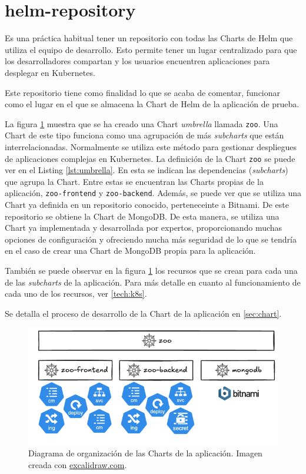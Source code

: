 \section{helm-repository}
\label{subsec:helm}

Es una práctica habitual tener un repositorio con todas las Charts de Helm que utiliza el equipo de desarrollo. Esto permite tener un lugar centralizado para que los desarrolladores compartan y los usuarios encuentren aplicaciones para desplegar en Kubernetes.

Este repositorio tiene como finalidad lo que se acaba de comentar, funcionar como el lugar en el que se almacena la Chart de Helm de la aplicación de prueba.

La figura \ref{fig:helm-repository} muestra que se ha creado una Chart \textit{umbrella} llamada \texttt{zoo}. Una Chart de este tipo funciona como una agrupación de más \textit{subcharts} que están interrelacionadas. Normalmente se utiliza este método para gestionar despliegues de aplicaciones complejas en Kubernetes.
La definición de la Chart \texttt{zoo} se puede ver en el Listing \ref{lst:umbrella}. En esta se indican las dependencias (\textit{subcharts}) que agrupa la Chart. Entre estas se encuentran las Charts propias de la aplicación, \texttt{zoo-frontend} y \texttt{zoo-backend}. Además, se puede ver que se utiliza una Chart ya definida en un repositorio conocido, perteneceinte a Bitnami\cite{bitnami}. De este repositorio se obtiene la Chart de MongoDB. De esta manera, se utiliza una Chart ya implementada y desarrollada por expertos, proporcionando muchas opciones de configuración y ofreciendo mucha más seguridad de lo que se tendría en el caso de crear una Chart de MongoDB propia para la aplicación.

También se puede observar en la figura \ref{fig:helm-repository} los recursos que se crean para cada una de las \textit{subcharts} de la aplicación. Para más detalle en cuanto al funcionamiento de cada uno de los recursos, ver \ref{tech:k8s}.

Se detalla el proceso de desarrollo de la Chart de la aplicación en \ref{sec:chart}.

\begin{figure}
  \centerline{\includegraphics[width=13cm]{figuras/helm-repository}}
  \caption{Diagrama de organización de las Charts de la aplicación. Imagen creada con \href{https://excalidraw.com}{excalidraw.com}.}
  \label{fig:helm-repository}
\end{figure}

